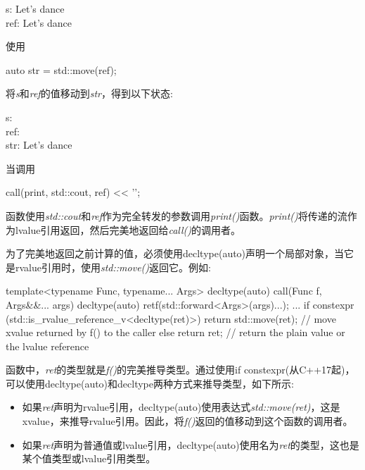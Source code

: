 \begin{myOutput}
s: Let's dance \\
ref: Let's dance
\end{myOutput}

使用\par

\begin{codebox}[cpp]
auto str = std::move(ref);
\end{codebox}

将\textit{s}和\textit{ref}的值移动到\textit{str}，得到以下状态:\par

\begin{myOutput}
s: \\
ref: \\
str: Let's dance
\end{myOutput}

当调用\par

\begin{codebox}[cpp]
call(print, std::cout, ref) << '\n';
\end{codebox}

函数使用\textit{std::cout}和\textit{ref}作为完全转发的参数调用\textit{print()}函数。\textit{print()}将传递的流作为lvalue引用返回，然后完美地返回给\textit{call()}的调用者。\par


为了完美地返回之前计算的值，必须使用decltype(auto)声明一个局部对象，当它是rvalue引用时，使用\textit{std::move()}返回它。例如:\par

\begin{codebox}[cpp]
template<typename Func, typename... Args>
decltype(auto) call(Func f, Args&&... args)
{
  decltype(auto) ret{f(std::forward<Args>(args)...)};
  ...
  if constexpr (std::is_rvalue_reference_v<decltype(ret)>) {
    return std::move(ret); // move xvalue returned by f() to the caller
  }
  else {
    return ret; // return the plain value or the lvalue reference
  }
}
\end{codebox}

函数中，\textit{ret}的类型就是\textit{f()}的完美推导类型。通过使用if constexpr(从C++17起)，可以使用decltype(auto)和decltype两种方式来推导类型，如下所示:\par

\begin{itemize}
  \item 如果\textit{ret}声明为rvalue引用，decltype(auto)使用表达式\textit{std::\allowbreak{}move(\allowbreak{}ret)\allowbreak{}}，这是xvalue，来推导rvalue引用。因此，将\textit{f()}返回的值移动到这个函数的调用者。
  \item 如果\textit{ret}声明为普通值或lvalue引用，decltype(auto)使用名为\textit{ret}的类型，这也是某个值类型或lvalue引用类型。
\end{itemize}


